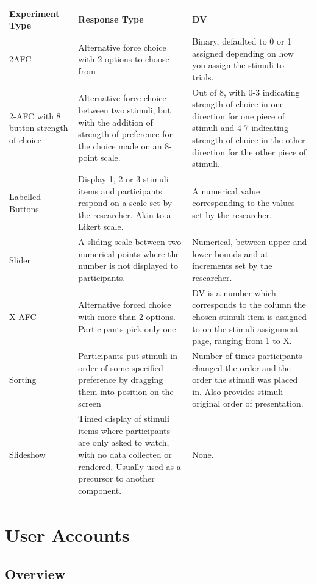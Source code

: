 \documentclass[]{book}
\begin{document}
\begin{tabular}{l|l|l}
\hline
Experiment Type & Response Type & DV\\
\hline
2AFC & Alternative force choice with 2 options to choose from & Binary, defaulted to 0 or 1 assigned depending on how you assign the stimuli to trials.\\
\hline
2-AFC with 8 button strength of choice & Alternative force choice between two stimuli, but with the addition of strength of preference for the choice made on an 8-point scale. & Out of 8, with 0-3 indicating strength of choice in one direction for one piece of stimuli and 4-7 indicating strength of choice in the other direction for the other piece of stimuli.\\
\hline
Labelled Buttons & Display 1, 2 or 3 stimuli items and participants respond on a scale set by the researcher. Akin to a Likert scale. & A numerical value corresponding to the values set by the researcher.\\
\hline
Slider & A sliding scale between two numerical points where the number is not displayed to participants. & Numerical, between upper and lower bounds and at increments set by the researcher.\\
\hline
X-AFC & Alternative forced choice with more than 2 options. Participants pick only one. & DV is a number which corresponds to the column the chosen stimuli item is assigned to on the stimuli assignment page, ranging from 1 to X.\\
\hline
Sorting & Participants put stimuli in order of some specified preference by dragging them into position on the screen & Number of times participants changed the order and the order the stimuli was placed in. Also provides stimuli original order of presentation.\\
\hline
Slideshow & Timed display of stimuli items where participants are only asked to watch, with no data collected or rendered. Usually used as a precursor to another component. & None.\\
\hline
\end{tabular}

\chapter{User Accounts}\label{accounts}

\section{Overview}\label{overview}
\end{document}
